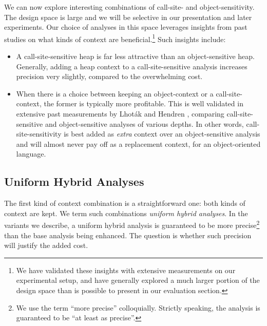 We can now explore interesting combinations of call-site- and
object-sensitivity. The design space is large and we will be selective
in our presentation and later experiments. Our choice of analyses in
this space leverages insights from past studies on what kinds of
context are beneficial.\footnote{We have validated these insights with
extensive measurements on our experimental setup, and have generally
explored a much larger portion of the design space than is possible to
present in our evaluation section.} Such insights include:
\begin{itemize}
\item A call-site-sensitive heap is far less attractive than an
object-sensitive heap. Generally, adding a heap context to a
call-site-sensitive analysis increases precision very slightly,
compared to the overwhelming cost.

\item When there is a choice between keeping an object-context or a
call-site-context, the former is typically more profitable. This is
well validated in extensive past measurements by Lhot\'{a}k and
Hendren \cite{1391987}, comparing call-site-sensitive and
object-sensitive analyses of various depths. In other words,
call-site-sensitivity is best added as \emph{extra} context over an
object-sensitive analysis and will almost never pay off as a
replacement context, for an object-oriented language.
\end{itemize}


\subsection{Uniform Hybrid Analyses}

The first kind of context combination is a straightforward one: both
kinds of context are kept. We term such combinations \emph{uniform
  hybrid analyses}. In the variants we describe, a uniform hybrid
analysis is guaranteed to be more precise\footnote{We use the term
  ``more precise'' colloquially. Strictly speaking, the analysis is
  guaranteed to be ``at least as precise''.} than the base analysis
being enhanced. The question is whether such precision will justify
the added cost.


